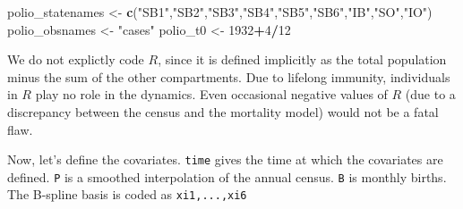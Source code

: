 \documentclass[]{article}
\newenvironment{Shaded}{\begin{snugshade}}{\end{snugshade}}
\newcommand{\KeywordTok}[1]{\textcolor[rgb]{0.13,0.29,0.53}{\textbf{#1}}}
\newcommand{\DataTypeTok}[1]{\textcolor[rgb]{0.13,0.29,0.53}{#1}}
\newcommand{\DecValTok}[1]{\textcolor[rgb]{0.00,0.00,0.81}{#1}}
\newcommand{\StringTok}[1]{\textcolor[rgb]{0.31,0.60,0.02}{#1}}
\newcommand{\OperatorTok}[1]{\textcolor[rgb]{0.81,0.36,0.00}{\textbf{#1}}}
\newcommand{\NormalTok}[1]{#1}
\begin{document}
\begin{Shaded}
\begin{Highlighting}[]
\NormalTok{polio_statenames <-}\StringTok{ }\KeywordTok{c}\NormalTok{(}\StringTok{"SB1"}\NormalTok{,}\StringTok{"SB2"}\NormalTok{,}\StringTok{"SB3"}\NormalTok{,}\StringTok{"SB4"}\NormalTok{,}\StringTok{"SB5"}\NormalTok{,}\StringTok{"SB6"}\NormalTok{,}\StringTok{"IB"}\NormalTok{,}\StringTok{"SO"}\NormalTok{,}\StringTok{"IO"}\NormalTok{)}
\NormalTok{polio_obsnames <-}\StringTok{ "cases"}
\NormalTok{polio_t0 <-}\StringTok{ }\DecValTok{1932}\OperatorTok{+}\DecValTok{4}\OperatorTok{/}\DecValTok{12}
\end{Highlighting}
\end{Shaded}

We do not explictly code \(R\), since it is defined implicitly as the
total population minus the sum of the other compartments. Due to
lifelong immunity, individuals in \(R\) play no role in the dynamics.
Even occasional negative values of \(R\) (due to a discrepancy between
the census and the mortality model) would not be a fatal flaw.

Now, let's define the covariates. \texttt{time} gives the time at which
the covariates are defined. \texttt{P} is a smoothed interpolation of
the annual census. \texttt{B} is monthly births. The B-spline basis is
coded as \texttt{xi1,...,xi6}

\begin{Shaded}
\end{Shaded}
\end{document}
